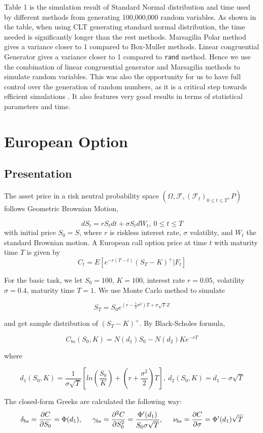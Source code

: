 \documentclass[11pt,a4paper,fleqn]{article}
\begin{document}
Table 1  is the simulation result of Standard Normal distribution and time used by different methods from generating 100,000,000 random variables. As shown in the table, when using CLT generating standard normal distribution, the time needed is significantly longer than the rest methods. Marsagilia Polar method gives a variance closer to 1 compared to Box-Muller methods. Linear congruential Generator gives a variance closer to 1 compared to \texttt{rand} method. Hence we use the combination of linear congruential generator and Marsagilia methods to simulate random variables. This was also the opportunity for us to have full control over the generation of random numbers, as it is a critical step towards efficient simulations \cite{lectures}. It also features very good results in terms of statistical parameters and time.


\FloatBarrier

\section{European Option}

\subsection{Presentation}
The asset price in a risk neutral probability space $(\Omega, \mathcal{F}, (\mathcal{F}_t)_{0\leq t\leq T}, P)$ follows Geometric Brownian Motion,

$$dS_t=rS_tdt+\sigma S_tdW_t, \ 0\leq t \leq T$$
with initial price $S_0 = S$, where $r$ is riskless interest rate, $\sigma$ volatility, and $W_t$ the standard Brownian motion. A European call option price at time $t$ with maturity time $T$ is given by
$$C_t = E[e^{-r(T-t)}(S_T-K)^+|\textit{F}_t]$$

For the basic task, we let $S_0 = 100$, $K=100$, interest rate $r = 0.05$, volatility $\sigma = 0.4$, maturity time $T =1$. We use Monte Carlo method to simulate

$$S_T=S_0e^{(r-\frac{1}{2}\sigma ^2)T+\sigma \sqrt{T}Z} $$

and get sample distribution of $(S_T-K)^+$. By Black-Scholes formula,


$$C_{bs}(S_0, K) = N(d_1)S_0 - N(d_2)Ke^{-rT}$$

where

$$d_1(S_0,K)=\frac{1}{\sigma \sqrt{T}}[ln(\frac{S_0}{K})+(r+\frac{\sigma^2}{2})T],\ d_2(S_0,K) = d_1-\sigma \sqrt{T}$$

The closed-form Greeks are calculated the following way:
$$\delta_{bs} = \frac{\partial C}{\partial S_0}=\Phi(d_1),\hspace*{.5cm} \gamma_{bs} = \frac{\partial^2 C}{\partial S_0^2}=\frac{\Phi'(d_1)}{S_0\sigma \sqrt{T}},\hspace*{.5cm} \nu_{bs} =  \frac{\partial C}{\partial \sigma}=\Phi'(d_1)\sqrt{T}$$
\end{document}
